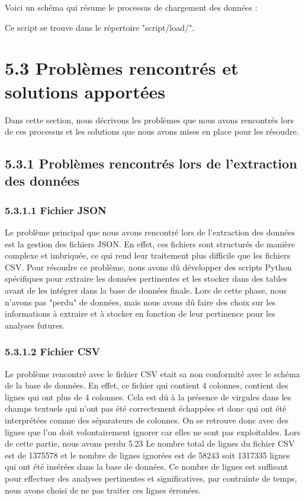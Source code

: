 Voici un schéma qui résume le processus de chargement des données :

Ce script se trouve dans le répertoire   "script/load/".

\section{5.3 Problèmes rencontrés et solutions apportées}

Dans cette section, nous décrivons les problèmes que nous avons rencontrés lors de ces processus et les solutions que nous avons mises en place pour les résoudre.

\subsection{5.3.1 Problèmes rencontrés lors de l'extraction des données}


\subsubsection{5.3.1.1 Fichier JSON}

Le problème principal que nous avons rencontré lors de l'extraction des données est la gestion des fichiers JSON.
En effet, ces fichiers sont structurés de manière complexe et imbriquée, ce qui rend leur traitement plus difficile que les fichiers CSV.
Pour résoudre ce problème, nous avons dû développer des scripts Python spécifiques pour extraire les données pertinentes et les stocker dans des tables avant de les intégrer dans la base de données finale.
Lors de cette phase, nous n'avons pas "perdu" de données, mais nous avons dû faire des choix sur les informations à extraire et à stocker en fonction de leur pertinence pour les analyses futures.

\subsubsection{5.3.1.2 Fichier CSV}

Le problème rencontré avec le fichier CSV etait sa non conformité avec le schéma de la base de données.
En effet, ce fichier qui contient 4 colonnes, contient des lignes qui ont plus de 4 colonnes.
Cela est dû à la présence de virgules dans les champs textuels qui n'ont pas été correctement échappées et donc qui ont été interprétées comme des séparateurs de colonnes.
On se retrouve donc avec des lignes que l'on doit volontairement ignorer car elles ne sont pas exploitables.
Lors de cette partie, nous avons perdu 5.23%
Le nombre total de lignes du fichier CSV est de 1375578 et le nombre de lignes ignorées est de 58243 soit 1317335 lignes qui ont été insérées dans la base de données.
Ce nombre de lignes est suffisant pour effectuer des analyses pertinentes et significatives, par contrainte de temps, nous avons choisi de ne pas traiter ces lignes érronées.


